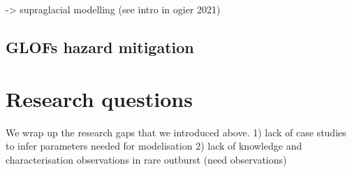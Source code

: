\cite{Kingslake&al2015} -> supraglacial modelling (see intro in ogier 2021)

\subsection{GLOFs hazard mitigation}



\section{Research questions}


We wrap up the research gaps that we introduced above. 
1) lack of case studies to infer parameters needed for modelisation 
2) lack of knowledge and characterisation observations in rare outburst (need observations)

